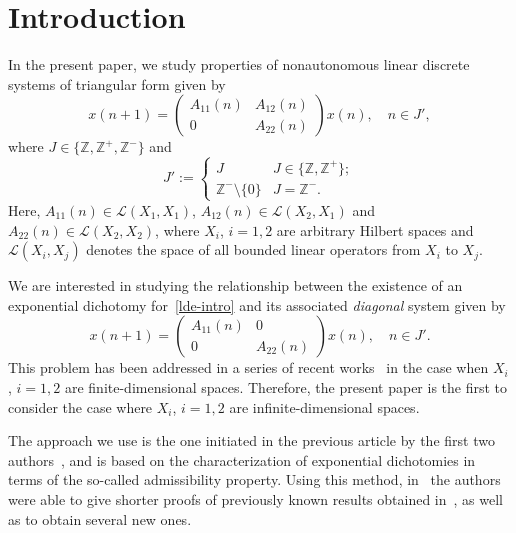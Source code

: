 \documentclass[11pt,reqno,a4paper]{amsart}
\theoremstyle{plain}
\numberwithin{equation}{section}
\theoremstyle{remark}
\def\Z{\mathbb{Z}}
\begin{document}
\section{Introduction}
In the present paper, we study properties of nonautonomous linear discrete systems of triangular form given by 
\begin{equation}\label{lde-intro}
x(n+1)=\begin{pmatrix}A_{11}(n) & A_{12}(n)\\ 0 & A_{22}(n)\end{pmatrix}x(n), \quad n\in J',\end{equation}
where $J\in \{\Z, \Z^+, \Z^-\}$ and 
\begin{equation}\label{Jprime}
J':=\begin{cases}
J & J\in \{\Z, \Z^+\}; \\
\Z^-\setminus \{0\} & J=\Z^-.
\end{cases}
\end{equation}
 Here, $A_{11}(n)\in \mathcal L(X_1, X_1)$, $A_{12}(n)\in \mathcal L(X_2, X_1)$ and $A_{22}(n)\in \mathcal L(X_2, X_2)$, where $X_i$, $i=1, 2$ are arbitrary Hilbert spaces and $\mathcal L(X_i, X_j)$ denotes the space of all bounded linear operators from $X_i$ to $X_j$. 

 We are interested in studying the relationship between the existence of an exponential dichotomy for~\eqref{lde-intro} and its associated \emph{diagonal} system given by 
\begin{equation}\label{de-intro}
x(n+1)=\begin{pmatrix}A_{11}(n) & 0\\ 0 & A_{22}(n)\end{pmatrix}x(n), \quad n\in J'.
\end{equation}
This problem has been addressed in a series of recent works~\cite{BFP1, BFP2, BP, DP, CP} in the case when $X_i$, $i=1, 2$ are finite-dimensional spaces. Therefore, the present paper is the first to consider the case where $X_i$, $i=1, 2$ are infinite-dimensional spaces. 

The approach we use is the one initiated in the previous article by the first two authors~\cite{DP}, and is based on the characterization of exponential dichotomies in terms of the so-called admissibility property. Using this method, in~\cite{DP} the authors were able to give shorter proofs of previously known results obtained in~\cite{BFP2, BP}, as well as to obtain several new ones. 
\end{document}
